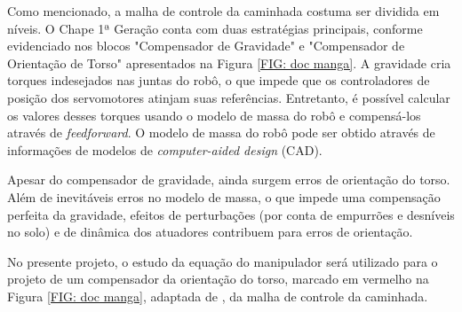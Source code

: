 Como mencionado, a malha de controle da caminhada costuma ser dividida em níveis. O Chape 1ª Geração conta com duas estratégias principais, conforme evidenciado nos blocos "Compensador de Gravidade" e "Compensador de Orientação de Torso" apresentados na Figura \ref{FIG: doc manga}. A gravidade cria torques indesejados nas juntas do robô, o que impede que os controladores de posição dos servomotores atinjam suas referências. Entretanto, é possível calcular os valores desses torques usando o modelo de massa do robô e compensá-los através de \emph{feedforward}. O modelo de massa do robô pode ser obtido através de informações de modelos de \emph{computer-aided design} (CAD). 

Apesar do compensador de gravidade, ainda surgem erros de orientação do torso. Além de inevitáveis erros no modelo de massa, o que impede uma compensação perfeita da gravidade, efeitos de perturbações (por conta de empurrões e desníveis no solo) e de dinâmica dos atuadores contribuem para erros de orientação.

No presente projeto, o estudo da equação do manipulador será utilizado para o projeto de um compensador da orientação do torso, marcado em vermelho na Figura \ref{FIG: doc manga}, adaptada de \cite{tesemarcos}, da malha de controle da caminhada. 

